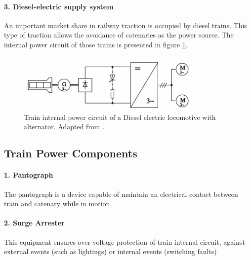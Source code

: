 \paragraph{3. Diesel-electric supply system\\}

An important market share in railway traction is occupied by diesel trains. This type of traction allows the avoidance of catenaries as the power source. The internal power circuit of those trains is presented in figure \ref{fig:steimel2008c}.

\begin{figure}[h!]
	\centering
	\begin{minipage}{.6\textwidth}
		\centering
		\includegraphics[width=0.8\textwidth,keepaspectratio]{figures/31.PowerS/steimel2008c}
		\caption{Train internal power circuit of a Diesel electric locomotive with alternator. Adapted from \cite{steimel2008}.}
		\label{fig:steimel2008c}
	\end{minipage}
\end{figure}


\subsection{Train Power Components}
\label{subs:314}
\paragraph{1. Pantograph\\}

	The pantograph is a device capable of maintain an electrical contact between train and catenary while in motion.
	
\paragraph{2. Surge Arrester\\}

	This equipment ensures over-voltage protection of train internal circuit, against external events (such as lightings) or internal events (switching faults)
	
